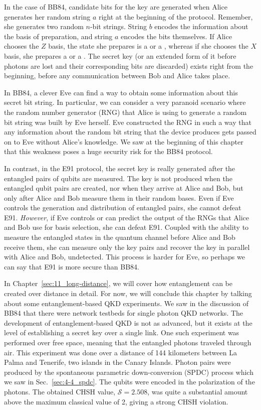 In the case of BB84, candidate bits for the key are generated when Alice generates her random string $a$ right at the beginning of the protocol.
Remember, she generates two random $n$-bit strings.
String $b$ encodes the information about the basis of preparation, and string $a$ encodes the bits themselves.
If Alice chooses the $Z$ basis, the state she prepares is a  or a , whereas if she chooses the $X$ basis, she prepares a \ket{+} or a \ket{-}.
The secret key (or an extended form of it before photons are lost and their corresponding bits are discarded) exists right from the beginning, before any communication between Bob and Alice takes place.

In BB84, a clever Eve can find a way to obtain some information about this secret bit string.
In particular, we can consider a very paranoid scenario where the random number generator (RNG) that Alice is using to generate a random bit string was built by Eve herself.
Eve constructed the RNG in such a way that any information about the random bit string that the device produces gets passed on to Eve without Alice's knowledge.
We saw at the beginning of this chapter that this weakness poses a huge security risk for the BB84 protocol.

In contrast, in the E91 protocol, the secret key is really generated after the entangled pairs of qubits are measured.
The key is not produced when the entangled qubit pairs are created, nor when they arrive at Alice and Bob, but only after Alice and Bob measure them in their random bases.
Even if Eve controls the generation and distribution of entangled pairs, she cannot defeat E91.
\emph{However}, if Eve controls or can predict the output of the RNGs that Alice and Bob use for basis selection, she can defeat E91.
Coupled with the ability to measure the entangled states in the quantum channel before Alice and Bob receive them, she can measure only the key pairs and recover the key in parallel with Alice and Bob, undetected. This process is harder for Eve, so perhaps we can say that E91 is more secure than BB84.

In Chapter~\ref{sec:11_long-distance}, we will cover how entanglement can be created over distance in detail.
For now, we will conclude this chapter by talking about some entanglement-based QKD experiments.
We saw in the discussion of BB84 that there were network testbeds for single photon QKD networks.
The development of entanglement-based QKD is not as advanced, but it exists at the level of establishing a secret key over a single link.
One such experiment was performed over free space, meaning that the entangled photons traveled through air.
This experiment was done over a distance of 144 kilometers between La Palma and Tenerife, two islands in the Canary Islands.
Photon pairs were produced by the spontaneous parametric down-conversion (SPDC) process which we saw in Sec.~\ref{sec:4-4_spdc}.
The qubits were encoded in the polarization of the photons.
The obtained CHSH value, $\mathcal{S} =2.508$, was quite a substantial amount above the maximum classical value of 2, giving a strong CHSH violation.

